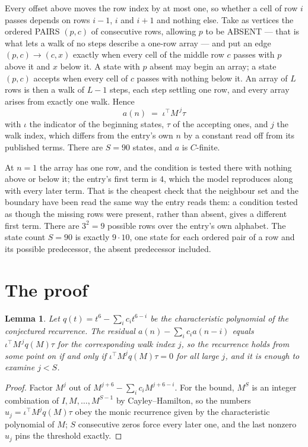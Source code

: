 \documentclass[11pt,a4paper]{article}
\theoremstyle{plain}
\newtheorem{lemma}[theorem]{Lemma}
\theoremstyle{definition}
\begin{document}
Every offset above moves the row index by at most one, so whether a cell of row $i$ passes
depends on rows $i-1$, $i$ and $i+1$ and nothing else. Take as vertices the ordered PAIRS
$(p,c)$ of consecutive rows, allowing $p$ to be ABSENT --- that is what lets a walk of no steps
describe a one-row array --- and put an edge $(p,c)\to(c,x)$ exactly when every cell of the
middle row $c$ passes with $p$ above it and $x$ below it. A state with $p$ absent may begin an
array; a state $(p,c)$ accepts when every cell of $c$ passes with nothing below it. An array of
$L$ rows is then a walk of $L-1$ steps, each step settling one row, and every array arises from
exactly one walk. Hence
\[
a(n)\;=\;\iota^{\!\top}M^{\,j}\tau
\]
with $\iota$ the indicator of the beginning states, $\tau$ of the accepting ones, and $j$ the
walk index, which differs from the entry's own $n$ by a constant read off from its published
terms. There are $S=90$ states, and $a$ is $C$-finite.

At $n=1$ the array has one row, and
the condition is tested there with nothing above or below it; the entry's first term is
$4$, which the model reproduces along with every later term. That is the cheapest check
that the neighbour set and the boundary have been read the same way the entry reads them: a
condition tested as though the missing rows were present, rather than absent, gives a different
first term. There are $3^{2}=9$ possible rows over the entry's own alphabet. The state count $S=90$ is exactly $9\cdot10$,
one state for each ordered pair of a row and its possible predecessor, the absent predecessor
included.

\section{The proof}

\begin{lemma}\label{lem:crit}
Let $q(t)=t^{6}-\sum_i c_it^{6-i}$ be the characteristic polynomial of the
conjectured recurrence. The residual $a(n)-\sum_ic_ia(n-i)$ equals
$\iota^{\!\top}M^{\,j}q(M)\tau$ for the corresponding walk index $j$, so the recurrence
holds from some point on if and only if $\iota^{\!\top}M^{j}q(M)\tau=0$ for all large $j$,
and it is enough to examine $j<S$.
\end{lemma}

\begin{proof}
Factor $M^{j}$ out of $M^{j+6}-\sum_ic_iM^{j+6-i}$. For the bound, $M^{S}$
is an integer combination of $I,M,\dots,M^{S-1}$ by Cayley--Hamilton, so the numbers
$u_j=\iota^{\!\top}M^{j}q(M)\tau$ obey the monic recurrence given by the characteristic
polynomial of $M$; $S$ consecutive zeros force every later one, and the last nonzero $u_j$
pins the threshold exactly.
\end{proof}
\end{document}
